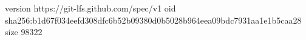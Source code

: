 version https://git-lfs.github.com/spec/v1
oid sha256:b1d67f034eefd308dfc6b52b09380d0b5028b964eea09bdc7931aa1e1b5caa28
size 98322
